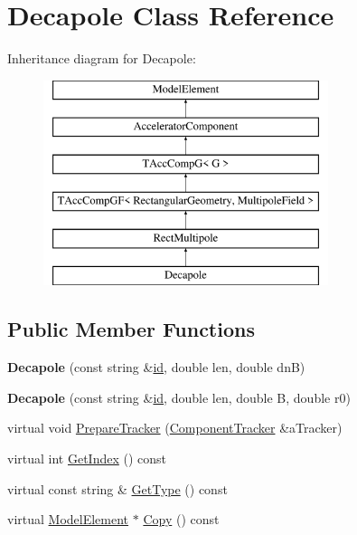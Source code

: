\hypertarget{classDecapole}{}\section{Decapole Class Reference}
\label{classDecapole}
Inheritance diagram for Decapole\+:\begin{figure}[H]
\begin{center}
\leavevmode
\includegraphics[height=6.000000cm]{classDecapole}
\end{center}
\end{figure}
\subsection*{Public Member Functions}
\begin{DoxyCompactItemize}
\item 
\mbox{\label{classDecapole_aef67b36ade58a9fe117943cca2f4f4ef}} 
{\bfseries Decapole} (const string \&\hyperlink{classModelElement_aada171ead2085c75b592cf07d91bc5c2}{id}, double len, double dnB)
\item 
\mbox{\label{classDecapole_a7343a8e327da5d756edb2a1c69ebf591}} 
{\bfseries Decapole} (const string \&\hyperlink{classModelElement_aada171ead2085c75b592cf07d91bc5c2}{id}, double len, double B, double r0)
\item 
virtual void \hyperlink{classDecapole_a7fd7331bfbc39982539f8077afef2e6e}{Prepare\+Tracker} (\hyperlink{classComponentTracker}{Component\+Tracker} \&a\+Tracker)
\item 
virtual int \hyperlink{classDecapole_ac34dc3e11924c94ff4464cc0ca5ddf68}{Get\+Index} () const
\item 
virtual const string \& \hyperlink{classDecapole_af39bab6b0dd2177c83cc8dd548401103}{Get\+Type} () const
\item 
virtual \hyperlink{classModelElement}{Model\+Element} $\ast$ \hyperlink{classDecapole_a050b4c993227a975118da09b638ec450}{Copy} () const
\end{DoxyCompactItemize}

